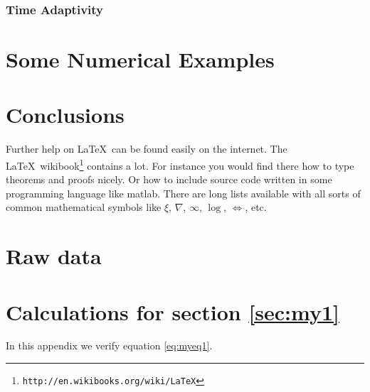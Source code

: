 \documentclass{uonmathreport}
\theoremstyle{definition}
\theoremstyle{problem}
\theoremstyle{theorem}
\begin{document}
\subsubsection{Time Adaptivity} \label{subsubsec:Time Adaptivity}

\newpage

\section{Some Numerical Examples} \label{sec:Examples}

\newpage


\section{Conclusions} \label{sec:conclusions}

Further help on \LaTeX\ can be found easily on the internet. The \LaTeX\
wikibook\footnote{\tt http://en.wikibooks.org/wiki/LaTeX} contains a lot.
For instance you would find there how to type theorems and proofs nicely.
Or how to include source code written in some programming language like
matlab. There are long lists available with all sorts of common
mathematical symbols like $\xi$, $\nabla$, $\infty$, $\log$, $\iff$, etc.

\newpage

\appendix

\section{Raw data} \label{app:rawdata}



\section{Calculations for section \ref{sec:my1}} \label{app:calculations}

In this appendix we verify equation \eqref{eq:myeq1}.

\newpage

	
	
\end{document}
